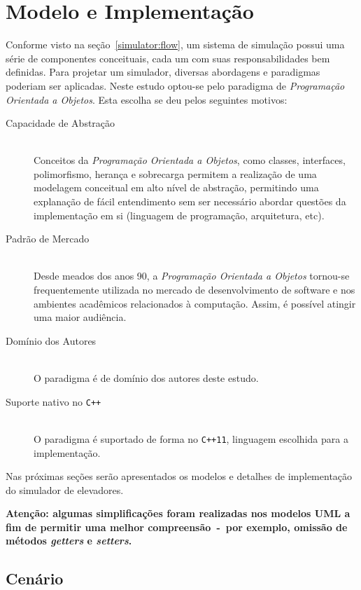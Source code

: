 \chapter{\label{chap:model}Modelo e Implementação}

Conforme visto na seção~\ref{simulator:flow}, um sistema de simulação possui uma
série de componentes conceituais, cada um com suas responsabilidades bem
definidas. Para projetar um simulador, diversas abordagens e paradigmas poderiam
ser aplicadas. Neste estudo optou-se pelo paradigma de \textit{Programação
Orientada a Objetos}. Esta escolha se deu pelos seguintes motivos:

\begin{description}
  \item[Capacidade de Abstração]\hfill \\
    Conceitos da \textit{Programação Orientada a Objetos}, como classes,
    interfaces, polimorfismo, herança e sobrecarga permitem a realização de uma
    modelagem conceitual em alto nível de abstração, permitindo uma explanação
    de fácil entendimento sem ser necessário abordar questões da implementação
    em si (linguagem de programação, arquitetura, etc).
  \item[Padrão de Mercado]\hfill \\
    Desde meados dos anos 90, a \textit{Programação Orientada a Objetos}
    tornou-se frequentemente utilizada no mercado de desenvolvimento de software
    e nos ambientes acadêmicos relacionados à computação. Assim, é possível
    atingir uma maior audiência.
  \item[Domínio dos Autores]\hfill \\
    O paradigma é de domínio dos autores deste estudo.
  \item[Suporte nativo no \texttt{C++}]\hfill \\
    O paradigma é suportado de forma no \texttt{C++11}, linguagem escolhida para
    a implementação.
\end{description}

Nas próximas seções serão apresentados os modelos e detalhes de implementação do
simulador de elevadores.

\textbf{Atenção: algumas simplificações foram realizadas nos modelos UML a fim
de permitir uma melhor compreensão~-~por exemplo, omissão de métodos
\textit{getters} e \textit{setters}.}

\section{\label{model:scenario}Cenário}

